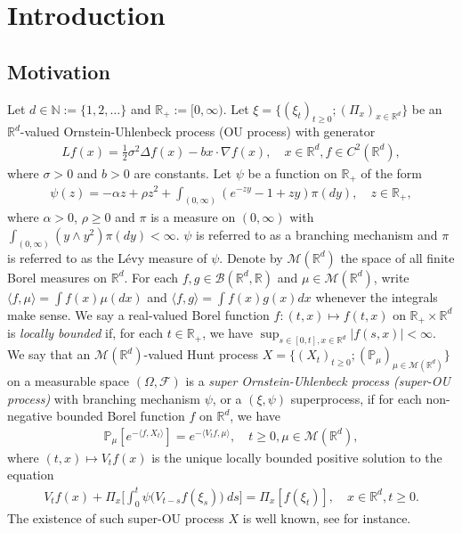 \documentclass[12pt,a4paper]{amsart}
\theoremstyle{plain}
\theoremstyle{definition}
\numberwithin{equation}{section}
\begin{document}
\section{Introduction}
\subsection{Motivation}
\label{sec: Motivation}
Let $d \in \mathbb N:= \{1,2,\dots\}$ and $\mathbb R_+:= [0,\infty)$.
Let $\xi=\{(\xi_t)_{t\geq 0}; (\Pi_x)_{x\in \mathbb R^d}\}$ be an $\mathbb R^d$-valued Ornstein-Uhlenbeck process (OU process) with generator
\begin{align}
  Lf(x)
  = \frac{1}{2}\sigma^2\Delta f(x)-b x \cdot \nabla f(x)
  , \quad  x\in \mathbb R^d, f \in C^2(\mathbb R^d),
\end{align}
where $\sigma > 0$ and $b > 0$ are constants.
Let $\psi$ be a function on $\mathbb R_+$ of the form 
\begin{align} 
  \label{eq: honogeneou branching mechanism}
  \psi(z)=
  - \alpha z + \rho z^2 + \int_{(0,\infty)} (e^{-zy} - 1 + zy) \pi(dy)
  , \quad  z \in \mathbb R_+,
\end{align}
where $\alpha > 0 $, $\rho \geq0$ and $\pi$ is a measure on $(0,\infty)$ with $\int_{(0,\infty)}(y\wedge y^2) \pi(dy)< \infty$.
$\psi$ is referred to as a branching mechanism and $\pi$ is referred to as the L\'evy measure of $\psi$.
Denote by $\mathcal M(\mathbb R^d)$ the space of all finite Borel measures on $\mathbb R^d$.
For each $f,g\in \mathcal B(\mathbb R^d, \mathbb R)$ and $\mu \in \mathcal M(\mathbb R^d)$, write $\langle f,\mu\rangle = \int f(x)\mu(dx)$ and $\langle f, g\rangle = \int f(x)g(x) dx$ whenever the integrals make sense.
We say a real-valued Borel function $f:(t,x)\mapsto f(t,x)$ on $\mathbb R_+\times \mathbb R^d$ is \emph{locally bounded} if, for each $t\in \mathbb R_+$, we have
$
\sup_{s\in [0,t],x\in \mathbb R^d} |f(s,x)|<\infty.
$
We say that an $\mathcal M(\mathbb R^d)$-valued Hunt process $X = \{(X_t)_{t\geq 0}; (\mathbb{P}_{\mu})_{\mu \in \mathcal M(\mathbb R^d)}\}$ on a measurable space $(\Omega, \mathcal{F})$ is a \emph{super Ornstein-Uhlenbeck process (super-OU process)} with branching mechanism $\psi$, or a $(\xi, \psi)$ superprocess, if for each non-negative bounded Borel function $f$ on $\mathbb R^d$, we have
\begin{align}
  \label{eq: def of V_t}
  \mathbb{P}_{\mu}[e^{-\langle f,X_t \rangle}]
  = e^{-\langle V_tf, \mu \rangle}
  , \quad t\geq 0, \mu \in \mathcal M(\mathbb R^d),
\end{align}
where $(t,x) \mapsto V_tf(x)$ is the unique locally bounded positive solution to the equation
\begin{align}
  V_tf(x) + \Pi_x \Big[ \int_0^t\psi\big(V_{t-s}f(\xi_s)\big)~ds\Big]
	= \Pi_x [f(\xi_t)]
  , \quad x\in \mathbb R^d, t\geq 0.
\end{align}	
The existence of such super-OU process $X$ is well known, see \cite{Dynkin1993Superprocesses} for instance.
\end{document}

